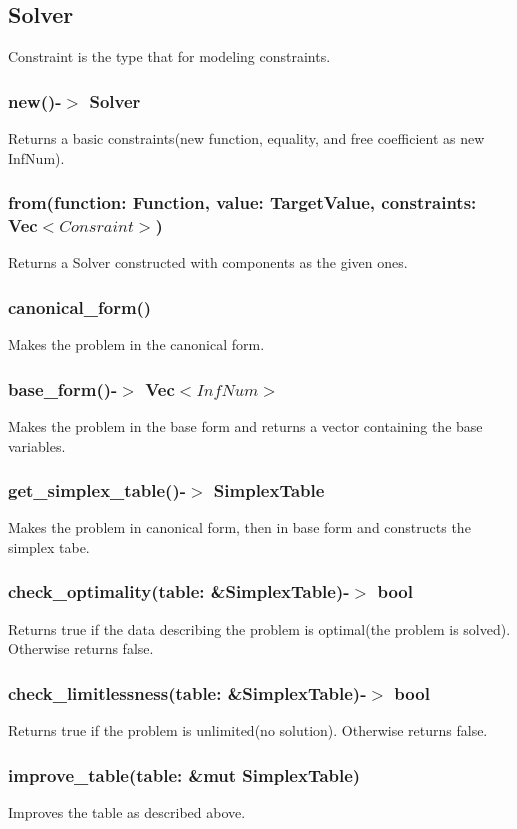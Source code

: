 \documentclass[]{article}
\begin{document}
			\subsection{Solver}
				\Large{Constraint is the type that for modeling constraints.}
				\subsubsection{new()-$>$ Solver}
					Returns a basic constraints(new function, equality, and free coefficient as new InfNum).
				\subsubsection{from(function: Function, value: TargetValue, constraints: Vec$<Consraint>$)}
					Returns a Solver constructed with components as the given ones.
				\subsubsection{canonical\_form()}
					Makes the problem in the canonical form.
				\subsubsection{base\_form()-$>$ Vec$<InfNum>$}
					Makes the problem in the base form and returns a vector containing the base variables.
				\subsubsection{get\_simplex\_table()-$>$ SimplexTable}
					Makes the problem in canonical form, then in base form and constructs the simplex tabe.
				\subsubsection{check\_optimality(table: \&SimplexTable)-$>$ bool}
					Returns true if the data describing the problem is optimal(the problem is solved). Otherwise returns false.
				\subsubsection{check\_limitlessness(table: \&SimplexTable)-$>$ bool}
					Returns true if the problem is unlimited(no solution). Otherwise returns false.
				\subsubsection{improve\_table(table: \&mut SimplexTable)}
					Improves the table as described above.
	\newpage
\end{document}
